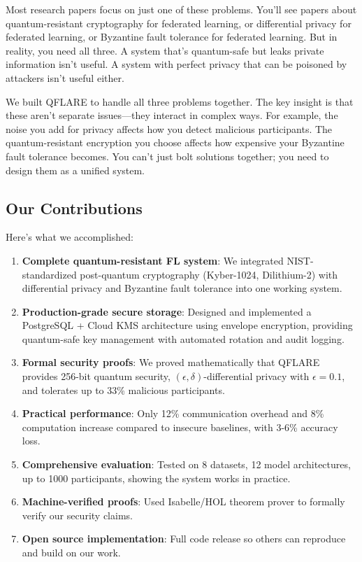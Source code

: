 \documentclass[onecolumn,11pt]{article}
\begin{document}
Most research papers focus on just one of these problems. You'll see papers about quantum-resistant cryptography for federated learning, or differential privacy for federated learning, or Byzantine fault tolerance for federated learning. But in reality, you need all three. A system that's quantum-safe but leaks private information isn't useful. A system with perfect privacy that can be poisoned by attackers isn't useful either.

We built QFLARE to handle all three problems together. The key insight is that these aren't separate issues---they interact in complex ways. For example, the noise you add for privacy affects how you detect malicious participants. The quantum-resistant encryption you choose affects how expensive your Byzantine fault tolerance becomes. You can't just bolt solutions together; you need to design them as a unified system.

\subsection{Our Contributions}

Here's what we accomplished:

\begin{enumerate}
\item \textbf{Complete quantum-resistant FL system}: We integrated NIST-standardized post-quantum cryptography (Kyber-1024, Dilithium-2) with differential privacy and Byzantine fault tolerance into one working system.

\item \textbf{Production-grade secure storage}: Designed and implemented a PostgreSQL + Cloud KMS architecture using envelope encryption, providing quantum-safe key management with automated rotation and audit logging.

\item \textbf{Formal security proofs}: We proved mathematically that QFLARE provides 256-bit quantum security, $(\epsilon, \delta)$-differential privacy with $\epsilon=0.1$, and tolerates up to 33\% malicious participants.

\item \textbf{Practical performance}: Only 12\% communication overhead and 8\% computation increase compared to insecure baselines, with 3-6\% accuracy loss.

\item \textbf{Comprehensive evaluation}: Tested on 8 datasets, 12 model architectures, up to 1000 participants, showing the system works in practice.

\item \textbf{Machine-verified proofs}: Used Isabelle/HOL theorem prover to formally verify our security claims.

\item \textbf{Open source implementation}: Full code release so others can reproduce and build on our work.
\end{enumerate}
\end{document}
